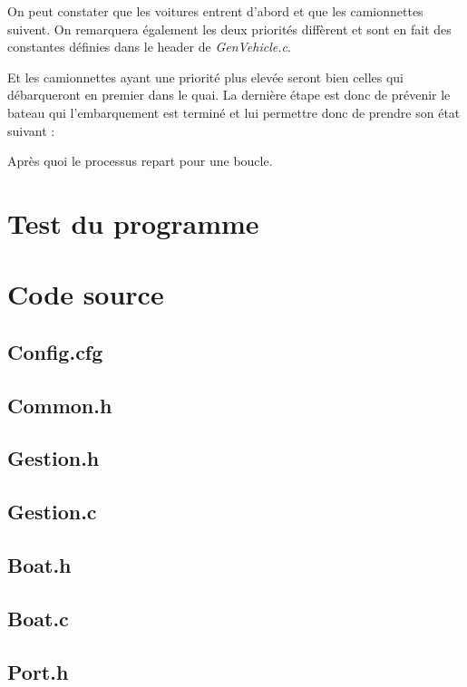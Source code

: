 \documentclass[a4paper, 11pt]{article}
\begin{document}
		
		On peut constater que les voitures entrent d'abord et que les camionnettes suivent. On remarquera également les deux priorités diffèrent et sont en fait des constantes définies dans le header de \textit{GenVehicle.c}.
		
		Et les camionnettes ayant une priorité plus elevée seront bien celles qui débarqueront en premier dans le quai. La dernière étape est donc de prévenir le bateau qui l'embarquement est terminé et lui permettre donc de prendre son état suivant :
		
		Après quoi le processus repart pour une boucle.

\section{Test du programme}
\section{Code source}
	\subsection{Config.cfg}
		
	\subsection{Common.h}
		
	\subsection{Gestion.h}
		
	\subsection{Gestion.c}
		
	\subsection{Boat.h}
		
	\subsection{Boat.c}
		
	\subsection{Port.h}
		
\end{document}
